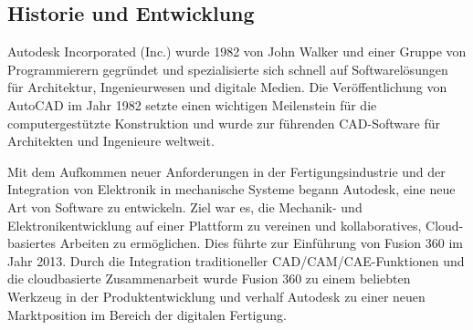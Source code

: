 \subsection*{Historie und Entwicklung}
Autodesk Incorporated (Inc.) wurde 1982 von John Walker und einer Gruppe von Programmierern gegründet und spezialisierte sich schnell auf Softwarelösungen für Architektur, Ingenieurwesen und digitale Medien. \autocite{wikipedia_autodesk}
Die Veröffentlichung von AutoCAD im Jahr 1982 setzte einen wichtigen Meilenstein für die computergestützte Konstruktion und wurde zur führenden CAD-Software für Architekten und Ingenieure weltweit.\autocite{wikipedia_autocad_version_history}


Mit dem Aufkommen neuer Anforderungen in der Fertigungsindustrie und der Integration von Elektronik in mechanische Systeme begann Autodesk, eine neue Art von Software zu entwickeln. Ziel war es, die Mechanik- und Elektronikentwicklung auf einer Plattform zu vereinen und kollaboratives, Cloud-basiertes Arbeiten zu ermöglichen. Dies führte zur Einführung von Fusion 360 im Jahr 2013. \autocite{wikipedia_autodesk_deutsch}
Durch die Integration traditioneller CAD/CAM/CAE-Funktionen und die cloudbasierte Zusammenarbeit wurde Fusion 360 zu einem beliebten Werkzeug in der Produktentwicklung und verhalf Autodesk zu einer neuen Marktposition im Bereich der digitalen Fertigung.

